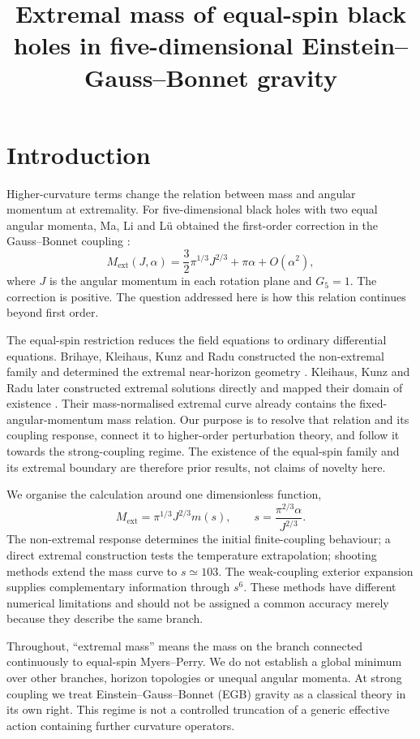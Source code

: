 \documentclass[11pt,a4paper]{article}
\title{Extremal mass of equal-spin black holes in five-dimensional Einstein--Gauss--Bonnet gravity}
\newcommand{\ext}{\mathrm{ext}}
\begin{document}
\maketitle

\section{Introduction}
Higher-curvature terms change the relation between mass and angular momentum at extremality. For five-dimensional black holes with two equal angular momenta, Ma, Li and L\"u obtained the first-order correction in the Gauss--Bonnet coupling \cite{Ma2020}:
\begin{equation}
 M_\ext(J,\alpha)=\frac32\pi^{1/3}J^{2/3}+\pi\alpha+O(\alpha^2),
 \label{eq:linear}
\end{equation}
where $J$ is the angular momentum in each rotation plane and $G_5=1$. The correction is positive. The question addressed here is how this relation continues beyond first order.

The equal-spin restriction reduces the field equations to ordinary differential equations. Brihaye, Kleihaus, Kunz and Radu constructed the non-extremal family and determined the extremal near-horizon geometry \cite{Brihaye2010}. Kleihaus, Kunz and Radu later constructed extremal solutions directly and mapped their domain of existence \cite{KKR2023}. Their mass-normalised extremal curve already contains the fixed-angular-momentum mass relation. Our purpose is to resolve that relation and its coupling response, connect it to higher-order perturbation theory, and follow it towards the strong-coupling regime. The existence of the equal-spin family and its extremal boundary are therefore prior results, not claims of novelty here.

We organise the calculation around one dimensionless function,
\begin{equation}
 M_\ext=\pi^{1/3}J^{2/3}m(s),\qquad
 s=\frac{\pi^{2/3}\alpha}{J^{2/3}}.
 \label{eq:scaling}
\end{equation}
The non-extremal response determines the initial finite-coupling behaviour; a direct extremal construction tests the temperature extrapolation; shooting methods extend the mass curve to $s\simeq103$. The weak-coupling exterior expansion supplies complementary information through $s^6$. These methods have different numerical limitations and should not be assigned a common accuracy merely because they describe the same branch.

Throughout, ``extremal mass'' means the mass on the branch connected continuously to equal-spin Myers--Perry. We do not establish a global minimum over other branches, horizon topologies or unequal angular momenta. At strong coupling we treat Einstein--Gauss--Bonnet (EGB) gravity as a classical theory in its own right. This regime is not a controlled truncation of a generic effective action containing further curvature operators.
\end{document}
